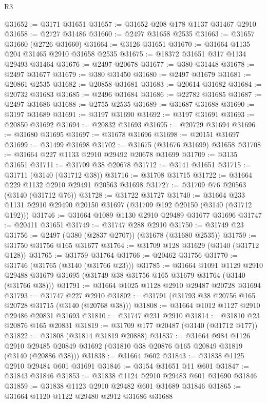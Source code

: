 \begin{lexlean}{R3}
\begin{coremodule}
@31652 := @3171 @31651
@31657 := @31652 @208 @178 @1137 @31467 @2910
@31658 := @2727 @31486
@31660 := @2497 @31658 @2535
@31663 := @31657 @31660 (@2726 @31660)
@31664 := @3126 @31651
@31670 := @31664 @1135 @204 @31465 @2910 @31658 @2535
@31675 := @18372 @31651 @317 @1134 @29493 @31464
@31676 := @2497 @20678
@31677 := @380 @31448
@31678 := @2497 @31677
@31679 := @380 @31450
@31680 := @2497 @31679
@31681 := @20861 @2535
@31682 := @20858 @31681
@31683 := @20614 @31682
@31684 := @20732 @31683
@31685 := @2496 @31684
@31686 := @22782 @31685
@31687 := @2497 @31686
@31688 := @2755 @2535
@31689 := @31687 @31688
@31690 := @3197 @31689
@31691 := @3197 @31690
@31692 := @3197 @31691
@31693 := @20850 @31692
@31694 := @20832 @31693
@31695 := @20729 @31694
@31696 := @31680 @31695
@31697 := @31678 @31696
@31698 := @20151 @31697
@31699 := @31499 @31698
@31702 := @31675 (@31676 @31699) @31658
@31708 := @31664 @227 @1133 @2910 @29492 @20678 @31699
@31709 := @3135 @31651
@31711 := @31709 @38 @20678
@31712 := @3141 @31651
@31715 := @31711 (@3140 (@31712 @38))
@31716 := @31708 @31715
@31722 := @31664 @229 @1132 @2910 @29491 @20563 @31698
@31727 := @31709 @76 @20563 (@3140 (@31712 @76))
@31728 := @31722 @31727
@31740 := @31664 @233 @1131 @2910 @29490 @20150 @31697 (@31709 @192 @20150 (@3140 (@31712 @192)))
@31746 := @31664 @1089 @1130 @2910 @29489 @31677 @31696
@31747 := @20411 @31651
@31749 := @31747 @288 @2910
@31750 := @31749 @23
@31756 := @2497 (@380 (@2837 @2707)) (@31678 (@31680 @2535))
@31759 := @31750 @31756 @165 @31677
@31764 := @31709 @128 @31629 (@3140 (@31712 @128))
@31765 := @31759 @31764
@31766 := @20462 @31756
@31770 := @31746 (@31765 (@3140 (@31766 @23)))
@31785 := @31664
    @1091
    @1129
    @2910
    @29488
    @31679
    @31695
    (@31749 @38 @31756 @165 @31679 @31764 (@3140 (@31766 @38)))
@31791 := @31664 @1025 @1128 @2910 @29487 @20728 @31694
@31793 := @31747 @227 @2910
@31802 := @31791 (@31793 @38 @20756 @165 @20728 @31715 (@3140 (@20768 @38)))
@31808 := @31664 @1012 @1127 @2910 @29486 @20831 @31693
@31810 := @31747 @231 @2910
@31814 := @31810 @23 @20876 @165 @20831
@31819 := @31709 @177 @20487 (@3140 (@31712 @177))
@31822 := @31808 (@31814 @31819 @20888)
@31837 := @31664
    @984
    @1126
    @2910
    @29485
    @20849
    @31692
    (@31810 @38 @20876 @165 @20849 @31819 (@3140 (@20886 @38)))
@31838 := @31664 @602
@31843 := @31838 @1125 @2910 @29484 @601 @31691
@31846 := @3154 @31651 @11 @601
@31847 := @31843 @31846
@31853 := @31838 @1124 @2910 @29483 @601 @31690 @31846
@31859 := @31838 @1123 @2910 @29482 @601 @31689 @31846
@31865 := @31664 @1120 @1122 @29480 @2912 @31686 @31688

\end{coremodule}
\end{lexlean}
